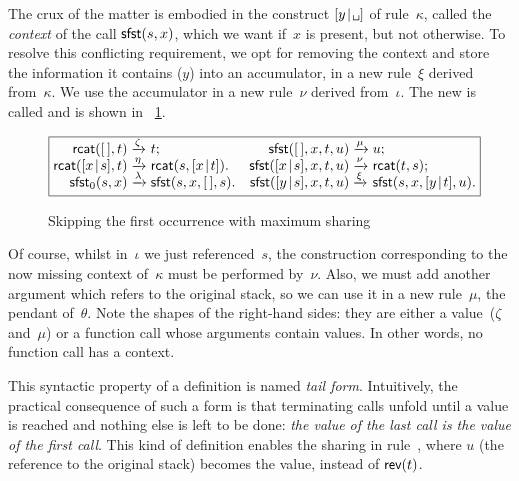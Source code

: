 The crux of the matter is embodied in the construct
\(\cons{y}{\texttt{\textvisiblespace}}\) of rule~\(\kappa\), called
the \emph{context} of the
call \(\textsf{sfst}(s,x)\), which we want
if~\(x\) is present, but not otherwise. To resolve this conflicting
requirement, we opt for removing the context and store the information
it contains (\(y\)) into an accumulator, in a new rule~\(\xi\) derived
from~\(\kappa\). We use the accumulator in a new rule~\(\nu\) derived
from~\(\iota\). The new  is called
 and is shown in
\fig~\ref{fig:sfst0}.
\begin{figure}[b]
\begin{equation*}
\boxed{%
\begin{array}{@{}r@{\;}l@{\;}lr@{\;}l@{\;}l@{}}
\fun{rcat}(\el,t)              & \xrightarrow{\smash{\zeta}} & t; &
\fun{sfst}(\el,x,t,u)          & \xrightarrow{\smash{\mu}} & u;\\
\fun{rcat}(\cons{x}{s},t)      & \xrightarrow{\smash{\eta}}
                               & \fun{rcat}(s,\cons{x}{t}). &
\fun{sfst}(\cons{x}{s},x,t,u)  & \xrightarrow{\smash{\nu}}
                               & \fun{rcat}(t,s);\\
\fun{sfst}_0(s,x)              & \xrightarrow{\smash{\lambda}}
                               & \fun{sfst}(s,x,\el,s). &
\fun{sfst}(\cons{y}{s},x,t,u)  & \xrightarrow{\smash{\xi}}
                               & \fun{sfst}(s,x,\cons{y}{t},u).
\end{array}}
\end{equation*}
\caption{Skipping the first occurrence with maximum sharing
\label{fig:sfst0}}
\end{figure}
Of course, whilst in~\(\iota\) we just referenced~\(s\), the
construction corresponding to the now missing context of~\(\kappa\)
must be performed by~\(\nu\). Also, we must add another argument which
refers to the original stack, so we can use it in a new rule~\(\mu\),
the pendant of~\(\theta\). Note the shapes of the right\hyp{}hand
sides: they are either a value~(\(\zeta\) and~\(\mu\)) or a function
call whose arguments contain values. In other words, no function call
has a context.

This syntactic property of a definition is named \emph{tail
  form}. Intuitively, the
practical consequence of such a form is that terminating calls unfold
until a value is reached and nothing else is left to be done:
\emph{the value of the last call is the value of the first call}. This
kind of definition enables the sharing in rule~\clause{\mu}, where
\(u\) (the reference to the original stack) becomes the value, instead
of \(\textsf{rev}(t)\).

